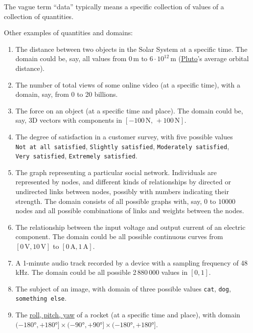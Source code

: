 \documentclass[
  a4paper,
  DIV=11,
  numbers=noendperiod,
  oneside]{scrreprt}
\begin{document}
The vague term ``data'' typically means a specific collection of values
of a collection of quantities.

Other examples of quantities and domains:

\begin{enumerate}
\def\labelenumi{\arabic{enumi}.}
\item
  The distance between two objects in the Solar System at a specific
  time. The domain could be, say, all values from \(0\,\mathrm{m}\) to
  \(6\cdot10^{12}\,\mathrm{m}\)
  (\href{https://solarsystem.nasa.gov/planets/dwarf-planets/pluto}{Pluto}'s
  average orbital distance).
\item
  The number of total views of some online video (at a specific time),
  with a domain, say, from 0 to 20 billions.
\item
  The force on an object (at a specific time and place). The domain
  could be, say, 3D vectors with components in
  \([-100\,\mathrm{N},\,+100\,\mathrm{N}]\).
\item
  The degree of satisfaction in a customer survey, with five possible
  values \texttt{Not\ at\ all\ satisfied}, \texttt{Slightly\ satisfied},
  \texttt{Moderately\ satisfied}, \texttt{Very\ satisfied},
  \texttt{Extremely\ satisfied}.
\item
  The graph representing a particular social network. Individuals are
  represented by nodes, and different kinds of relationships by directed
  or undirected links between nodes, possibly with numbers indicating
  their strength. The domain consists of all possible graphs with, say,
  \(0\) to \(10000\) nodes and all possible combinations of links and
  weights between the nodes.
\item
  The relationship between the input voltage and output current of an
  electric component. The domain could be all possible continuous curves
  from \([0\,\mathrm{V}, 10\,\mathrm{V}]\) to
  \([0\,\mathrm{A}, 1\,\mathrm{A}]\).
\item
  A 1-minute audio track recorded by a device with a sampling frequency
  of 48\,kHz. The domain could be all possible 2\,880\,000 values in
  \([0,1]\).
\item
  The subject of an image, with domain of three possible values
  \texttt{cat}, \texttt{dog}, \texttt{something\ else}.
\item
  The
  \href{https://www.grc.nasa.gov/www/k-12/rocket/rotations.html}{roll,
  pitch, yaw} of a rocket (at a specific time and place), with domain
  \((-180°,+180°]\times(-90°,+90°]\times(-180°,+180°]\).
\end{enumerate}
\end{document}

